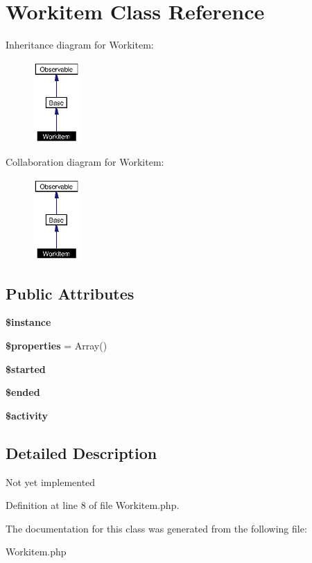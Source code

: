 \section{Workitem Class Reference}
\label{classWorkitem}
Inheritance diagram for Workitem:\begin{figure}[H]
\begin{center}
\leavevmode
\includegraphics[width=50pt]{classWorkitem__inherit__graph}
\end{center}
\end{figure}
Collaboration diagram for Workitem:\begin{figure}[H]
\begin{center}
\leavevmode
\includegraphics[width=50pt]{classWorkitem__coll__graph}
\end{center}
\end{figure}
\subsection*{Public Attributes}
\begin{CompactItemize}
\item 
{\bf \$instance}\label{classWorkitem_o0}

\item 
{\bf \$properties} = Array()\label{classWorkitem_o1}

\item 
{\bf \$started}\label{classWorkitem_o2}

\item 
{\bf \$ended}\label{classWorkitem_o3}

\item 
{\bf \$activity}\label{classWorkitem_o4}

\end{CompactItemize}


\subsection{Detailed Description}
Not yet implemented 



Definition at line 8 of file Workitem.php.

The documentation for this class was generated from the following file:\begin{CompactItemize}
\item 
Workitem.php\end{CompactItemize}
